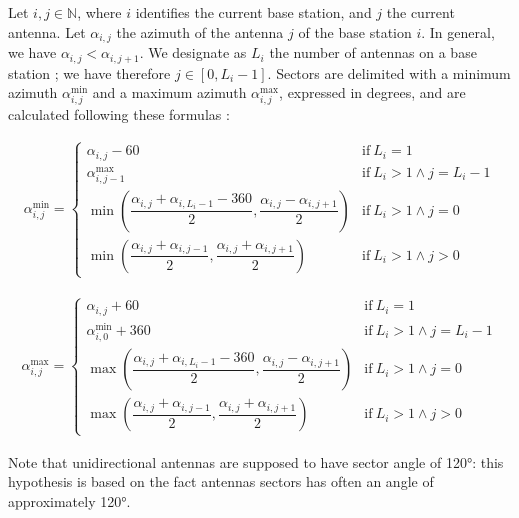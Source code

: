 \documentclass[a4paper, 11pt]{report}
\begin{document}
     Let $i, j \in \mathbb{N}$, where $i$ identifies the current base station, and $j$ the current antenna. Let $\alpha_{i, j}$ the azimuth of the antenna $j$ of the base station $i$. In general, we have $\alpha_{i, j} < \alpha_{i, j +1}$. We designate as $L_i$ the number of antennas on a base station ; we have therefore $j \in \left[0, L_i - 1\right]$. Sectors are delimited with a minimum azimuth $\alpha^{\text{min}}_{i, j}$ and a maximum azimuth $\alpha^{\text{max}}_{i, j}$, expressed in degrees, and are calculated following these formulas \cite{trieu_visualization_2019}:
    
    \begin{align}
        \alpha^{\text{min}}_{i, j} = \begin{cases}
            \alpha_{i, j} - 60 & \text{if} \ L_i = 1 \\[10pt]
            \alpha^{\text{max}}_{i, j - 1} & \text{if} \ L_i > 1 \land j = L_i - 1 \\[10pt]
            \min\left(\dfrac{\alpha_{i, j} + \alpha_{i, L_i - 1} - 360}{2}, \dfrac{\alpha_{i, j} - \alpha_{i, j + 1}}{2}\right) & \text{if} \ L_i > 1 \land j = 0 \\[10pt]
            \min\left(\dfrac{\alpha_{i, j} + \alpha_{i, j - 1}}{2}, \dfrac{\alpha_{i, j} + \alpha_{i, j + 1}}{2}\right) & \text{if} \ L_i > 1 \land j > 0
        \end{cases}
    \end{align}
        
    \begin{align}
        \alpha^{\text{max}}_{i, j} = \begin{cases}
            \alpha_{i, j} + 60 & \text{if} \ L_i = 1 \\[10pt]
            \alpha^{\text{min}}_{i, 0} + 360 & \text{if} \ L_i > 1 \land j = L_i - 1 \\[10pt]
            \max\left(\dfrac{\alpha_{i, j} + \alpha_{i, L_i - 1} - 360}{2}, \dfrac{\alpha_{i, j} - \alpha_{i, j + 1}}{2}\right) & \text{if} \ L_i > 1 \land j = 0 \\[10pt]
            \max\left(\dfrac{\alpha_{i, j} + \alpha_{i, j - 1}}{2}, \dfrac{\alpha_{i, j} + \alpha_{i, j + 1}}{2}\right) & \text{if} \ L_i > 1 \land j > 0
        \end{cases}
    \end{align}
    
    Note that unidirectional antennas are supposed to have sector angle of 120°: this hypothesis is based on the fact antennas sectors has often an angle of approximately 120°. \newline
    
\end{document}
